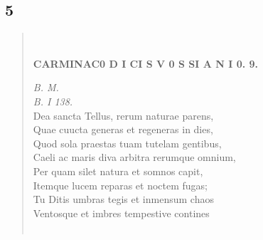 \documentclass[11pt, a4paper]{report}
\begin{document}
            \subsection*{5}
      \begin{verse}
      
        ﻿\pagebreak 
    \begin{center} \textbf{CARMINAC0 D I CI S V 0 S SI A N I 0. 9.} \end{center}\textit{B. M.} \\ \textit{B. I 138.} \\ Dea sancta Tellus, rerum naturae parens, \\ Quae cuucta generas et regeneras in dies, \\ Quod sola praestas  \lbrack tuam \rbrack  tutelam gentibus, \\ Caeli ac maris diva arbitra rerumque omnium, \\ Per quam silet natura et somnos capit, \\ Itemque lucem reparas et noctem fugas; \\ Tu Ditis umbras tegis et inmensum chaos \\ Ventosque et imbres tempestive contines \\ 
        ﻿\pagebreak 

\end{verse}
\end{document}
